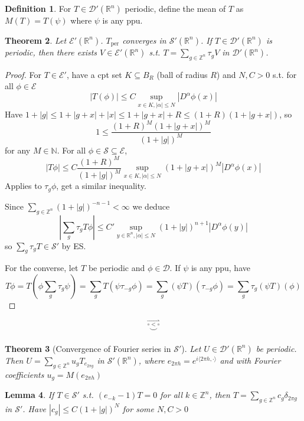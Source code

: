 \documentclass{article}
\theoremstyle{definition}
\newtheorem{defn}{Definition}[section]
\theoremstyle{remark}
\theoremstyle{plain}
\newtheorem{lem}[defn]{Lemma}
\newtheorem{thm}[defn]{Theorem}
\newcommand{\NN}{\mathbb{N}}
\newcommand{\ZZ}{\mathbb{Z}}
\newcommand{\RR}{\mathbb{R}}
\newcommand{\calD}{\mathcal{D}}
\begin{document}
\begin{defn}
    For $T\in\calD'(\RR^n)$ periodic, define the mean of $T$ as $M(T)= T(\psi)$ where $\psi$ is any ppu.
\end{defn}
\begin{thm}
    Let $\mathcal E'(\RR^n)$. $T_{\text{per}}$ converges in $\mathcal S'(\RR^n)$. If $T\in\calD'(\RR^n)$ is periodic, then there exists $V\in\mathcal E'(\RR^n)$ s.t. $T=\sum_{g\in\ZZ^n}\tau_g V$ in $\calD'(\RR^n)$.
\end{thm}
\begin{proof}
    For $T\in\mathcal E'$, have a cpt set $K\subseteq B_R$ (ball of radius $R$) and $N,C>0$ s.t. for all $\phi\in\mathcal E$
    \[|T(\phi)|\le C\sup_{x\in K,|\alpha|\le N}|D^\alpha\phi(x)|\]
    Have $1+|g|\le 1+|g+x|+|x|\le 1+|g+x|+R\le (1+R)(1+|g+x|)$, so 
    \[1\le \frac{(1+R)^M(1+|g+x|)^M}{(1+|g|)^M}\] for any $M\in\NN$.
    For all $\phi\in\mathcal S\subseteq\mathcal E$, 
    \[|T\phi|\le C\frac{(1+R)^M}{(1+|g|)^M}\sup_{x\in K,|\alpha|\le N}(1+|g+x|)^M|D^\alpha\phi(x)|\]
    Applies to $\tau_g\phi$, get a similar inequality.

    Since $\sum_{g\in\ZZ^n}(1+|g|)^{-n-1}<\infty$ we deduce
    \[|\sum_g\tau_g T\phi|\le C'\sup_{y\in\RR^n,|\alpha|\le N}(1+|y|)^{n+1}|D^\alpha\phi(y)|\]
    so $\sum_g\tau_g T\in\mathcal S'$ by ES.

    For the converse, let $T$ be periodic and $\phi\in\calD$. If $\psi$ is any ppu, have
    \[T\phi=T(\phi\sum_g\tau_g\psi)=\sum_g T(\psi\tau_{-g}\phi)=\sum_g(\psi T)(\tau_{-g}\phi)=\sum_g\tau_g(\psi T)(\phi)\]
\end{proof}
\[\overset{\rightharpoonup}{\overset{\circ<\circ}{\smile}}\tag{Owen's Signature}\]
\begin{thm}[Convergence of Fourier series in $\mathcal S'$]
  Let $U\in\mathcal D'(\RR^n)$ be periodic. Then $U=\sum_{g\in\ZZ^n}u_g T_{e_{2\pi g}}$ in $\mathcal S'(\RR^n)$, where $e_{2\pi h}=e^{i\langle 2\pi h,\cdot\rangle}$ and with Fourier coefficients $u_g=M(e_{2\pi h})$  
\end{thm}
\begin{lem}
    If $T\in\mathcal S'$ s.t. $(e_{-k}-1)T=0$ for all $k\in\ZZ^n$, then $T=\sum_{g\in\ZZ^n}c_g\delta_{2\pi g}$ in $\mathcal S'$. Have $|c_g|\le C(1+|g|)^N$ for some $N,C>0$
\end{lem}
\end{document}
